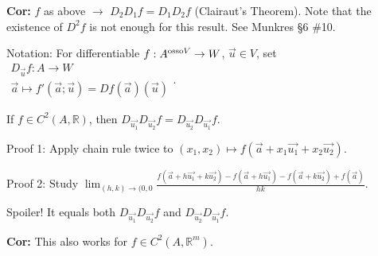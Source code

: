 \documentclass[10pt,letterpaper]{article}
\newcommand{\n}{\hfill\break}
\newcommand{\cor}[1]{\par\noindent\settowidth{\hangindent}{\textbf{Cor: }}\textbf{Cor: }#1\n}
\newcommand{\ptxt}[1]{\textrm{\textnormal{#1}}}
\newcommand{\reals}{\mathbb{R}}
\newcommand{\R}{\reals}
\begin{document}
\cor{$f$ as above $\to$ $D_{2}D_{1}f=D_{1}D_{2}f$ (Clairaut's Theorem). Note that the existence of $D^{2}f$ is not enough for this result. See Munkres \S{}6 \#10.}

\par\noindent Notation: For differentiable $f:A^{\ptxt{osso}V}\to{}W$, $\vec{u}\in{}V$, set $\begin{array}{ll}D_{\vec{u}}f:A\to{}W\\ \vec{a}\mapsto{}f'(\vec{a};\vec{u})=Df(\vec{a})(\vec{u})\end{array}$.\n

\par\noindent If $f\in{}C^{2}(A,\R)$, then $D_{\vec{u_{1}}}D_{\vec{u_{2}}}f=D_{\vec{u_{2}}}D_{\vec{u_{1}}}f$.\n

\par\noindent Proof 1: Apply chain rule twice to $(x_{1},x_{2})\mapsto{}f(\vec{a}+x_{1}\vec{u_{1}}+x_{2}\vec{u_{2}})$.\n

\par\noindent Proof 2: Study $\displaystyle\lim_{(h,k)\to(0,0}\frac{f(\vec{a}+h\vec{u_{1}}+k\vec{u_{2}})-f(\vec{a}+h\vec{u_{1}})-f(\vec{a}+k\vec{u_{2}})+f(\vec{a})}{hk}$.\n

\par\noindent Spoiler! It equals both $D_{\vec{u_{1}}}D_{\vec{u_{2}}}f$ and $D_{\vec{u_{2}}}D_{\vec{u_{1}}}f$.\n

\cor{This also works for $f\in{}C^{2}(A,\R^{m})$.}
\end{document}

